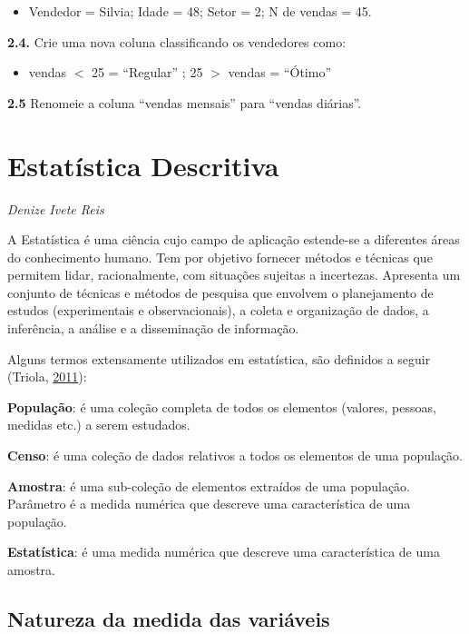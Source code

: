 \documentclass[12pt,brazil,oneside]{book}
\providecommand{\tightlist}{%
  \setlength{\itemsep}{0pt}\setlength{\parskip}{0pt}}
\begin{document}
\begin{itemize}
\tightlist
\item
  Vendedor = Silvia; Idade = 48; Setor = 2; N de vendas = 45.
\end{itemize}

\textbf{2.4.} Crie uma nova coluna classificando os vendedores como:

\begin{itemize}
\tightlist
\item
  vendas \(<\) 25 = ``Regular'' ; 25 \(>\) vendas = ``Ótimo''
\end{itemize}

\textbf{2.5} Renomeie a coluna ``vendas mensais'' para ``vendas diárias''.

\hypertarget{desc}{%
\chapter{Estatística Descritiva}\label{desc}}

\emph{Denize Ivete Reis}

\begin{flushright}
\emph{}
\end{flushright}

A Estatística é uma ciência cujo campo de aplicação estende-se a diferentes áreas do conhecimento humano. Tem por objetivo fornecer métodos e técnicas que permitem lidar, racionalmente, com situações sujeitas a incertezas. Apresenta um conjunto de técnicas e métodos de pesquisa que envolvem o planejamento de estudos (experimentais e observacionais), a coleta e organização de dados, a inferência, a análise e a disseminação de informação.

Alguns termos extensamente utilizados em estatística, são definidos a seguir (Triola, \protect\hyperlink{ref-triola1999}{2011}):

\textbf{População}: é uma coleção completa de todos os elementos (valores, pessoas, medidas etc.) a serem estudados.

\textbf{Censo}: é uma coleção de dados relativos a todos os elementos de uma população.

\textbf{Amostra}: é uma sub-coleção de elementos extraídos de uma população.
Parâmetro é a medida numérica que descreve uma característica de uma população.

\textbf{Estatística}: é uma medida numérica que descreve uma característica de uma amostra.

\hypertarget{natureza-da-medida-das-variaveis}{%
\section{Natureza da medida das variáveis}\label{natureza-da-medida-das-variaveis}}
\end{document}
